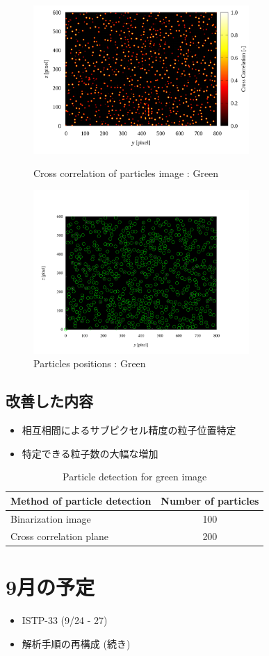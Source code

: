 \documentclass[twocolumn,a4j]{jsarticle}
\begin{document}
\begin{figure}[htbp]
  \includegraphics[keepaspectratio, width=82mm]{../images/cross_crr_particle.png}
  \caption{Cross correlation of particles image : Green}
  \includegraphics[keepaspectratio, width=82mm]{../images/particle_positions_green.png}
  \caption{Particles positions : Green}
\end{figure}

\subsection{改善した内容}
\begin{itemize}
  \item 相互相間によるサブピクセル精度の粒子位置特定
  \item 特定できる粒子数の大幅な増加
\end{itemize}

\begin{table}[hbtp]
  \centering
  \caption{Particle detection for green image}
  \begin{tabular}{l c}
    \hline
    Method of particle detection & Number of particles \\ \hline \hline
    Binarization image           & 100                 \\ \hline
    Cross correlation plane      & 200                 \\ \hline
  \end{tabular}
\end{table}



\section{9月の予定}
\begin{itemize}
  \item ISTP-33 (9/24 - 27)
  \item 解析手順の再構成 (続き)
\end{itemize}
\end{document}
